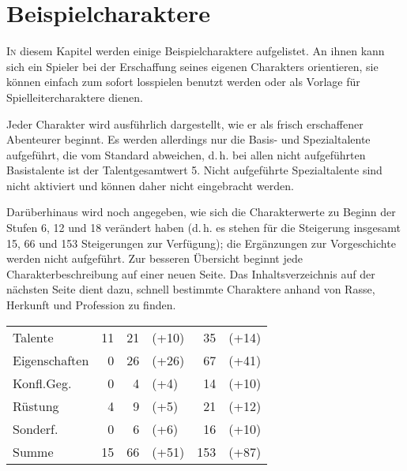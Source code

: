 \chapter{Beispielcharaktere}\label{Ch:Beispielcharaktere}


\lettrine{I}{n} diesem Kapitel werden einige Beispielcharaktere aufgelistet. An ihnen kann sich ein Spieler bei der Erschaffung seines eigenen Charakters orientieren, sie können einfach zum sofort losspielen benutzt werden oder als Vorlage für Spielleitercharaktere dienen.

Jeder Charakter wird ausführlich dargestellt, wie er als frisch erschaffener Abenteurer beginnt.  Es werden allerdings nur die Basis- und Spezialtalente aufgeführt, die vom Standard abweichen, d.\,h. bei allen nicht aufgeführten Basistalente ist der Talentgesamtwert 5. Nicht aufgeführte Spezialtalente sind nicht aktiviert und können daher nicht eingebracht werden.

Darüberhinaus wird noch angegeben, wie sich die Charakterwerte zu Beginn der Stufen 6, 12 und 18 verändert haben (d.\,h. es stehen für die Steigerung insgesamt 15, 66 und 153 Steigerungen zur Verfügung); die Ergänzungen zur Vorgeschichte werden nicht aufgeführt. Zur besseren Übersicht beginnt jede Charakterbeschreibung auf einer neuen Seite. Das Inhaltsverzeichnis auf der nächsten Seite dient dazu, schnell bestimmte Charaktere anhand von Rasse, Herkunft und Profession zu finden.

\begin{tabular}{lrrlrl}
Talente       & 11 & 21 & (+10) & 35 & (+14) \\
Eigenschaften &  0 & 26 & (+26) & 67 & (+41) \\
Konfl.Geg.    &  0 &  4 & (+4)  & 14 & (+10) \\
Rüstung       &  4 &  9 & (+5)  & 21 & (+12) \\
Sonderf.      &  0 &  6 & (+6)  & 16 & (+10) \\
\hline
Summe & 15 & 66 & (+51) & 153 & (+87) \\
\end{tabular}

